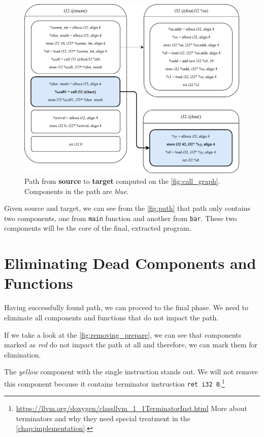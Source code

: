 \documentclass[12pt, twoside]{fithesis2}
\renewcommand{\_}{\leavevmode \kern0.07em\vbox{\hrule width0.4em}}
\begin{document}
\begin{figure}[ht]
    \centering
    \includegraphics[]{images/main_path.pdf}
    \caption{Path from \textbf{source} to \textbf{target} computed on the
    \autoref{fig:call_graph}. Components in the path are \emph{blue}.
    }
    \label{fig:path}
\end{figure}

Given source and target, we can see from the \autoref{fig:path} that path only
contains two components, one from \texttt{main} function and another
from \texttt{bar}. These two components will be the core of the final,
extracted program.

\section{Eliminating Dead Components and Functions}
\label{sec:design-removing}

Having successfully found path, we can proceed to the final phase.
We need to eliminate all components and functions that do not impact the path.

If we take a look at the \autoref{fig:removing_prepare}, we can see that
components marked as \emph{red} do not impact the path at all and therefore, we
can mark them for elimination.

The \emph{yellow} component with the single instruction stands out.
We will not remove this component because it contains
terminator instruction \texttt{ret i32 0}.\footnote{
\url{https://llvm.org/doxygen/classllvm_1_1TerminatorInst.html}
More about terminators and why they need special treatment in the
\autoref{chap:implementation}.
}
\end{document}
